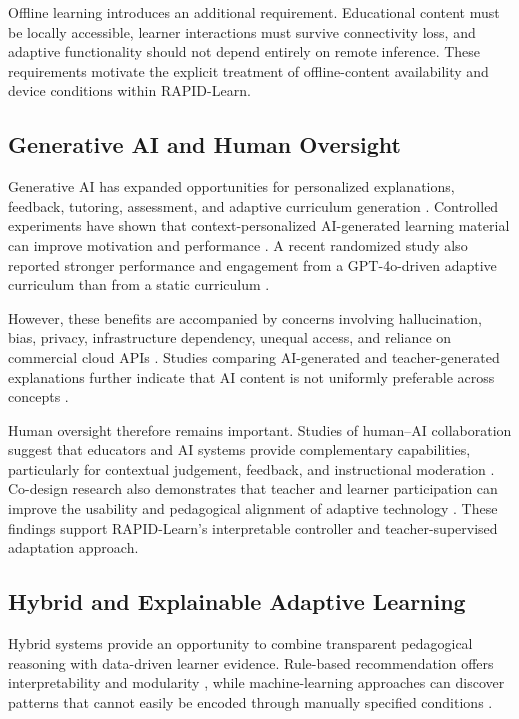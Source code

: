 \documentclass[conference]{IEEEtran}
\begin{document}
Offline learning introduces an additional requirement. Educational
content must be locally accessible, learner interactions must survive
connectivity loss, and adaptive functionality should not depend entirely
on remote inference. These requirements motivate the explicit treatment
of offline-content availability and device conditions within
RAPID-Learn.

\subsection{Generative AI and Human Oversight}

Generative AI has expanded opportunities for personalized explanations,
feedback, tutoring, assessment, and adaptive curriculum generation
\cite{mittal2024,pereira2025}. Controlled experiments have shown that
context-personalized AI-generated learning material can improve
motivation and performance \cite{tasdelen2025}. A recent randomized
study also reported stronger performance and engagement from a
GPT-4o-driven adaptive curriculum than from a static curriculum
\cite{samat2026}.

However, these benefits are accompanied by concerns involving
hallucination, bias, privacy, infrastructure dependency, unequal access,
and reliance on commercial cloud APIs
\cite{mittal2024,mimoudi2025}. Studies comparing AI-generated and
teacher-generated explanations further indicate that AI content is not
uniformly preferable across concepts \cite{lee2024}.

Human oversight therefore remains important. Studies of human--AI
collaboration suggest that educators and AI systems provide
complementary capabilities, particularly for contextual judgement,
feedback, and instructional moderation
\cite{tzirides2024,pahi2024}. Co-design research also demonstrates that
teacher and learner participation can improve the usability and
pedagogical alignment of adaptive technology
\cite{mejeh2025codesign}. These findings support RAPID-Learn's
interpretable controller and teacher-supervised adaptation approach.

\subsection{Hybrid and Explainable Adaptive Learning}

Hybrid systems provide an opportunity to combine transparent
pedagogical reasoning with data-driven learner evidence. Rule-based
recommendation offers interpretability and modularity
\cite{pelanek2024rules}, while machine-learning approaches can discover
patterns that cannot easily be encoded through manually specified
conditions \cite{hassanain2025}.
\end{document}
